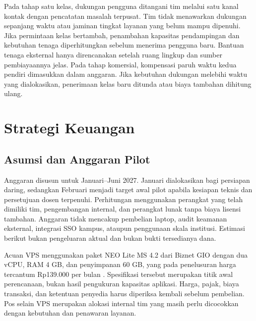 \documentclass[12pt,a4paper,oneside]{report}
\begin{document}
Pada tahap satu kelas, dukungan pengguna ditangani tim melalui satu kanal kontak dengan pencatatan masalah terpusat. Tim tidak menawarkan dukungan sepanjang waktu atau jaminan tingkat layanan yang belum mampu dipenuhi. Jika permintaan kelas bertambah, penambahan kapasitas pendampingan dan kebutuhan tenaga diperhitungkan sebelum menerima pengguna baru. Bantuan tenaga eksternal hanya direncanakan setelah ruang lingkup dan sumber pembiayaannya jelas. Pada tahap komersial, kompensasi paruh waktu kedua pendiri dimasukkan dalam anggaran. Jika kebutuhan dukungan melebihi waktu yang dialokasikan, penerimaan kelas baru ditunda atau biaya tambahan dihitung ulang.

\section{Strategi Keuangan}
\subsection{Asumsi dan Anggaran Pilot}
Anggaran disusun untuk Januari--Juni 2027. Januari dialokasikan bagi persiapan daring, sedangkan Februari menjadi target awal pilot apabila kesiapan teknis dan persetujuan dosen terpenuhi. Perhitungan menggunakan perangkat yang telah dimiliki tim, pengembangan internal, dan perangkat lunak tanpa biaya lisensi tambahan. Anggaran tidak mencakup pembelian laptop, audit keamanan eksternal, integrasi SSO kampus, ataupun penggunaan skala institusi. Estimasi berikut bukan pengeluaran aktual dan bukan bukti tersedianya dana.

Acuan VPS menggunakan paket NEO Lite MS 4.2 dari Biznet GIO dengan dua vCPU, RAM 4 GB, dan penyimpanan 60 GB, yang pada penelusuran harga tercantum Rp139.000 per bulan \citep{biznetgio}. Spesifikasi tersebut merupakan titik awal perencanaan, bukan hasil pengukuran kapasitas aplikasi. Harga, pajak, biaya transaksi, dan ketentuan penyedia harus diperiksa kembali sebelum pembelian. Pos selain VPS merupakan alokasi internal tim yang masih perlu dicocokkan dengan kebutuhan dan penawaran layanan.
\end{document}
